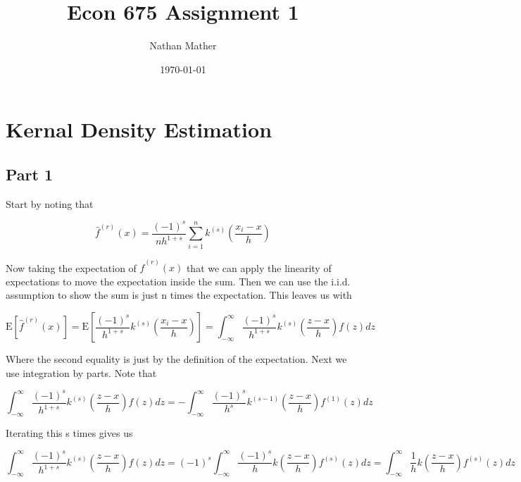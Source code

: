 \documentclass[11pt]{article}
\title{Econ 675 Assignment 1} %
\author{Nathan Mather} %
\date{\today} %
\newcommand{\E}{\mathrm{E}}
\begin{document}
	
\maketitle %

\setcounter{tocdepth}{2} %

\tableofcontents %


\section{Kernal Density Estimation}
\subsection{Part 1}

Start by noting that 

$$ \hat{f}^{(r)}(x) = \frac{(-1)^s}{nh^{1+s}} \sum_{i=1}^{n}k^{(s)} \left( \frac{{x}_i - x}{h} \right) 
$$

Now taking the expectation of $\hat{f}^{(r)}(x)$ that we can apply the linearity of expectations to move the expectation inside the sum. Then we can use the i.i.d. assumption to show the sum is just n times the expectation. This leaves us with 

$$  \E[\hat{f}^{(r)}(x)] = \E \left[ \frac{(-1)^s}{h^{1+s}} k^{(s)} \left( \frac{{x}_i - x}{h} \right)  \right]
= \int_{-\infty}^{\infty} \frac{(-1)^s}{h^{1+s}} k^{(s)} \left( \frac{z - x}{h} \right)f(z)dz
$$



Where the second equality is just by the definition of the expectation. Next we use integration by parts. Note that 

$$\int_{-\infty}^{\infty} \frac{(-1)^s}{h^{1+s}} k^{(s)} \left( \frac{z - x}{h} \right)f(z)dz = -\int_{-\infty}^{\infty} \frac{(-1)^s}{h^{s}} k^{(s-1)} \left( \frac{z - x}{h} \right)f^{(1)}(z)dz
$$

Iterating this s times gives us

$$\int_{-\infty}^{\infty} \frac{(-1)^s}{h^{1+s}} k^{(s)} \left( \frac{z - x}{h} \right)f(z)dz
=  (-1)^s \int_{-\infty}^{\infty} \frac{(-1)^s}{h} k \left( \frac{z - x}{h} \right)f^{(s)}(z)dz
= \int_{-\infty}^{\infty} \frac{1}{h} k \left( \frac{z - x}{h} \right)f^{(s)}(z)dz
$$
\end{document}
